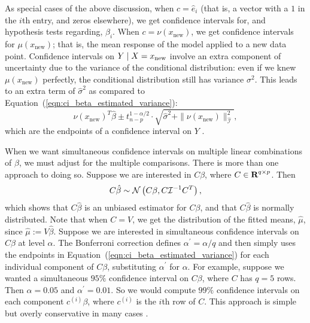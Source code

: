 \documentclass[12pt]{article}
\begin{document}
As special cases of the above discussion, when $c = \hat{e}_i$ (that is, a vector with a $1$ in the $i$th entry, and zeros elsewhere), we get confidence intervals for, and hypothesis tests regarding, $\beta_i$. When $c = \nu(x_\textrm{new})$, we get confidence intervals for $\mu(x_\textrm{new})$; that is, the mean response of the model applied to a new data point. Confidence intervals on $Y \; | \; X = x_\textrm{new}$ involve an extra component of uncertainty due to the variance of the conditional distribution: even if we knew $\mu(x_\textrm{new})$ perfectly, the conditional distribution still has variance $\sigma^2$. This leads to an extra term of $\hat{\sigma}^2$ as compared to Equation~(\ref{eqn:ci_beta_estimated_variance}):
\begin{displaymath}
\nu(x_\textrm{new})^T \hat{\beta} \pm t_{n-p}^{1-\alpha/2} \cdot \sqrt{\hat{\sigma}^2 + \| \nu(x_\textrm{new}) \|_{\hat{\mathcal{I}}}^2},
\end{displaymath}
which are the endpoints of a confidence interval on $Y$ \cite[\S 3.6]{Weisberg:2005}.

When we want simultaneous confidence intervals on multiple linear combinations of $\beta$, we must adjust for the multiple comparisons. There is more than one approach to doing so. Suppose we are interested in $C \beta$, where $C \in {\mbox{\bf R}}^{q \times p}$. Then
\begin{displaymath}
    C \hat{\beta} \sim {\mathcal N} \left( C \beta, C \mathcal{I}^{-1} C^T \right),
\end{displaymath}
which shows that $C \hat{\beta}$ is an unbiased estimator for $C \beta$, and that $C \hat{\beta}$ is normally distributed. Note that when $C = V$, we get the distribution of the fitted means, $\hat{\mu}$, since $\hat{\mu} := V \hat{\beta}$. Suppose we are interested in simultaneous confidence intervals on $C\beta$ at level $\alpha$. The Bonferroni correction defines $\alpha^\prime = \alpha / q$ and then simply uses the endpoints in Equation~(\ref{eqn:ci_beta_estimated_variance}) for each individual component of $C\beta$, substituting $\alpha^\prime$ for $\alpha$. For example, suppose we wanted a simultaneous $95\%$ confidence interval on $C\beta$, where $C$ has $q=5$ rows. Then $\alpha = 0.05$ and $\alpha^\prime = 0.01$. So we would compute $99\%$ confidence intervals on each component $c^{(i)} \beta$, where $c^{(i)}$ is the $i$th row of $C$. This approach is simple but overly conservative in many cases \cite[\S~9.1.3]{Weisberg:2005}.
\end{document}
